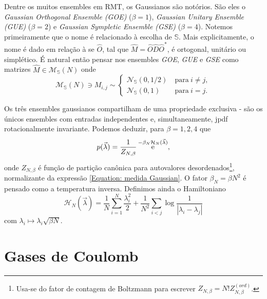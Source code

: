 \documentclass[11pt,twocolumn]{article}
\newcommand{\matriz}[1]{\hat#1}
\DeclareMathOperator{\ee}{\textrm e}
\newcommand{\p}{p} %
\newcommand{\Se}{\mathbb{S}}
\numberwithin{equation}{section} %
\begin{document}
Dentre os muitos ensembles em RMT, os Gaussianos são notórios. São eles o \textit{Gaussian Orthogonal Ensemble (GOE)} ($\beta=1$), \textit{Gaussian Unitary Ensemble (GUE)} ($\beta=2$) e \textit{Gaussian Sympletic Ensemble (GSE)} ($\beta=4$). Notemos primeiramente que o nome é relacionado à escolha de $\Se$. Mais explicitamente, o nome é dado em relação à se $\matriz{O}$, tal que $\matriz{M} = \matriz{O}\matriz{D}\matriz{O}^*$, é ortogonal, unitário ou simplético. É natural então pensar nos ensembles \textit{GOE}, \textit{GUE} e \textit{GSE} como matrizes $\matriz{M} \in \mathcal{M}_{\Se}(N)$ onde 
$$
\mathcal{M}_{\Se}(N) \ni M_{i,j} \sim
\begin{cases}
	\mathcal{N}_{\Se}(0,1/2) &  \ \text{para} \ i \neq j,\\
	\mathcal{N}_{\Se}(0,1) & \ \text{para} \ i = j.
\end{cases}
$$

Os três ensembles gaussianos compartilham de uma propriedade exclusiva - são os únicos ensembles com entradas independentes e, simultaneamente, jpdf rotacionalmente invariante. Podemos deduzir, para $\beta = 1,2,4$ que
\begin{equation}
	\p(\vec{\lambda}) = \frac{1}{Z_{N, \beta}} \ee^{-\beta_N \mathcal{H}_N(\vec{\lambda})},
	\label{Equation: medida Gaussian}
\end{equation}
onde $Z_{N, \beta}$ é função de partição canônica para autovalores desordenados\footnote{Usa-se do fator de contagem de Boltzmann para escrever $ Z_{N, \beta} = N! Z_{N, \beta}^{(ord)}$.}, normalizante da expressão \ref{Equation: medida Gaussian}. O fator $\beta_N = \beta N^2$ é pensado como a temperatura inversa. Definimos ainda o Hamiltoniano $$\mathcal{H}_N(\vec{\lambda}) = \frac{1}{N}\sum_{i = 1}^{N} \frac{\lambda_i^2}{2} + \frac{1}{N^2} \sum_{i < j} \log{\frac{1}{|\lambda_i - \lambda_j|}}$$ com  $\lambda_i \mapsto \lambda_i \sqrt{\beta N}$.

\section{Gases de Coulomb}
\end{document}
